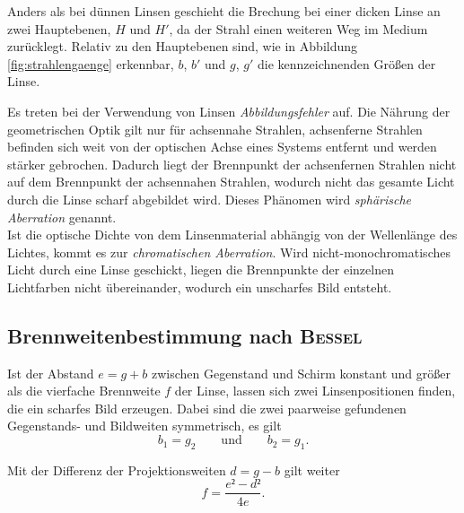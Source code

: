 Anders als bei dünnen Linsen geschieht die Brechung bei einer dicken Linse an zwei Hauptebenen, $H$ und $H'$, da der Strahl einen weiteren Weg im Medium zurücklegt.
Relativ zu den Hauptebenen sind, wie in Abbildung \ref{fig:strahlengaenge} erkennbar, $b$, $b'$ und $g$, $g'$ die kennzeichnenden Größen der Linse. 


Es treten bei der Verwendung von Linsen \emph{Abbildungsfehler} auf. 
Die Nährung der geometrischen Optik gilt nur für achsennahe Strahlen, achsenferne Strahlen befinden sich weit von der optischen Achse eines Systems entfernt und werden stärker gebrochen. 
Dadurch liegt der Brennpunkt der achsenfernen Strahlen nicht auf dem Brennpunkt der achsennahen Strahlen, wodurch nicht das gesamte Licht durch die Linse scharf abgebildet wird. Dieses Phänomen wird \emph{sphärische Aberration} genannt.\\
Ist die optische Dichte von dem Linsenmaterial abhängig von der Wellenlänge des Lichtes, kommt es zur \emph{chromatischen Aberration}. 
Wird nicht-monochromatisches Licht durch eine Linse geschickt, liegen die Brennpunkte der einzelnen Lichtfarben nicht übereinander, wodurch ein unscharfes Bild entsteht.

\subsection{Brennweitenbestimmung nach \texorpdfstring{\textsc{Bessel}}{Bessel}}
\label{sec:Theorie1}
Ist der Abstand $e=g+b$ zwischen Gegenstand und Schirm konstant und größer als die vierfache Brennweite $f$ der Linse, lassen sich zwei Linsenpositionen finden, die ein scharfes Bild erzeugen. 
Dabei sind die zwei paarweise gefundenen Gegenstands- und Bildweiten symmetrisch, es gilt
\begin{equation}
	b_1=g_2 \qquad \text{und} \qquad b_2=g_1.
\end{equation}

Mit der Differenz der Projektionsweiten $d= g-b$ gilt weiter
\begin{equation}
	f=\frac{e²-d²}{4e}.
\end{equation}

